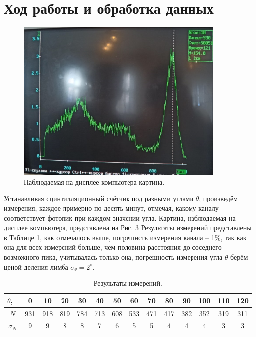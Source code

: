 \documentclass[a4paper,12pt]{article}
\theoremstyle{definition}
\begin{document}
\section*{Ход работы и обработка данных}
\begin{figure}
\vspace{-1cm}
\includegraphics[width = 0.9\textwidth]{4.png}
\centering
\caption{Наблюдаемая на дисплее компьютера картина.}
\end{figure}
Устанавливая сцинтилляционный счётчик под разными углами $\theta$, произведём измерения, каждое примерно по десять минут, отмечая, какому каналу соответствует фотопик при каждом значении угла. Картина, наблюдаемая на дисплее компьютера, представлена на Рис. 3
Результаты измерений представлены в Таблице 1, как отмечалось выше, погрешнсть измерения канала -- 1\%, так как она для всех измерений больше, чем половина расстояния до соседнего возможного пика, учитывалась только она, погрешность измерения угла $\theta$ берём ценой деления лимба $\sigma_\theta = 2^\circ$.
\begin{table}[h]
\begin{tabular}{|c|c|c|c|c|c|c|c|c|c|c|c|c|c|}
\hline
$\theta$, $^\circ$ & 0   & 10  & 20  & 30  & 40  & 50  & 60  & 70  & 80  & 90  & 100 & 110 & 120 \\ \hline
$N$                & 931 & 918 & 819 & 784 & 713 & 608 & 533 & 471 & 417 & 382 & 352 & 319 & 311 \\ \hline
$\sigma_N$         & 9   & 9   & 8   & 8   & 7   & 6   & 5   & 5   & 4   & 4   & 4   & 3   & 3   \\ \hline
\end{tabular}
\centering
\caption{Результаты измерений.}
\end{table}
\end{document}
